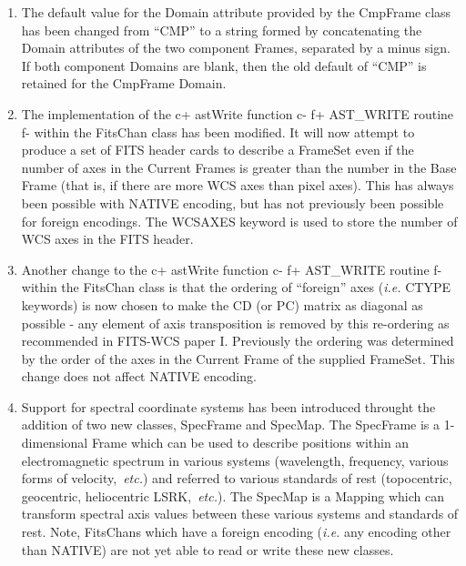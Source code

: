\documentclass[twoside,11pt]{starlink}
\begin{document}
\begin{enumerate}

\item The default value for the Domain attribute provided by the CmpFrame
class has been changed from ``CMP'' to a string formed by concatenating
the Domain attributes of the two component Frames, separated by a minus
sign. If both component Domains are blank, then the old default of
``CMP'' is retained for the CmpFrame Domain.

\item The implementation of the
c+
astWrite function
c-
f+
AST\_WRITE routine
f-
within the FitsChan class has been modified. It will now attempt to
produce a set of FITS header cards to describe a FrameSet even if the
number of axes in the Current Frames is greater than the number in the
Base Frame (that is, if there are more WCS axes than pixel axes). This
has always been possible with NATIVE encoding, but has not previously
been possible for foreign encodings. The WCSAXES keyword is used to store
the number of WCS axes in the FITS header.

\item Another change to the
c+
astWrite function
c-
f+
AST\_WRITE routine
f-
within the FitsChan class is that the ordering of ``foreign'' axes
(\emph{i.e.} CTYPE keywords) is now chosen to make the CD (or PC) matrix
as diagonal as possible - any element of axis transposition is removed by
this re-ordering as recommended in FITS-WCS paper I. Previously the
ordering was determined by the order of the axes in the Current Frame of
the supplied FrameSet. This change does not affect NATIVE encoding.

\item Support for spectral coordinate systems has been introduced
throught the addition of two new classes, SpecFrame and SpecMap.
The SpecFrame is a 1-dimensional Frame which can be used to describe
positions within an electromagnetic spectrum in various systems
(wavelength, frequency, various forms of velocity,~\emph{etc.}) and referred
to various standards of rest (topocentric, geocentric, heliocentric
LSRK,~\emph{etc.}). The SpecMap is a Mapping which can transform spectral
axis values between these various systems and standards of rest. Note,
FitsChans which have a foreign encoding (\emph{i.e.} any encoding other
than NATIVE) are not yet able to read or write these new classes.


\end{enumerate}
\end{document}
